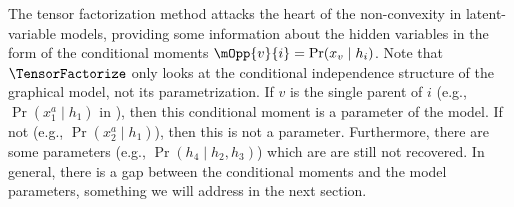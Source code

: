 The tensor factorization method attacks the heart of the non-convexity
  in latent-variable models, providing some information about the hidden variables
  in the form of the conditional moments $\mOpp{v}{i} = \Pr(x_v \mid h_i)$.
  Note that $\TensorFactorize$ only looks at the conditional independence structure
  of the graphical model, not its parametrization.
  If $v$ is the single parent of $i$ (e.g., $\Pr(x_1^a \mid h_1)$ in ),
  then this conditional moment is a parameter of the model.
  If not (e.g., $\Pr(x_2^a \mid h_1)$), then this is not a parameter.
  Furthermore, there are some parameters (e.g., $\Pr(h_4 \mid h_2, h_3)$) which are
  are still not recovered.
  In general, there is a gap between the conditional moments
  and the model parameters,
  something we will address in the next section.

